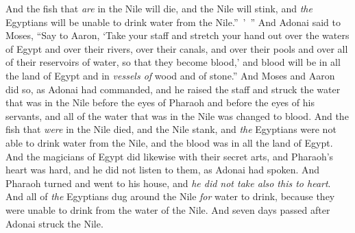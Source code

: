 \begin{biblechapter}
\verse And the fish that \textit{are} in the Nile will die, and the Nile will stink, and \textit{the} Egyptians will be unable to drink water from the Nile.” ’ ”
\verse And Adonai said to Moses, “Say to Aaron, ‘Take your staff and stretch your hand out over the waters of Egypt and over their rivers, over their canals, and over their pools and over all of their reservoirs of water, so that they become blood,’ and blood will be in all the land of Egypt and in \textit{vessels of} wood and of stone.”
\verse And Moses and Aaron did so, as Adonai had commanded, and he raised the staff and struck the water that was in the Nile before the eyes of Pharaoh and before the eyes of his servants, and all of the water that was in the Nile was changed to blood.
\verse And the fish that \textit{were} in the Nile died, and the Nile stank, and \textit{the} Egyptians were not able to drink water from the Nile, and the blood was in all the land of Egypt.
\verse And the magicians of Egypt did likewise with their secret arts, and Pharaoh’s heart was hard, and he did not listen to them, as Adonai had spoken.
\verse And Pharaoh turned and went to his house, and \textit{he did not take also this to heart}.
\verse And all of \textit{the} Egyptians dug around the Nile \textit{for} water to drink, because they were unable to drink from the water of the Nile.
\verse And seven days passed after Adonai struck the Nile.
\end{biblechapter}

